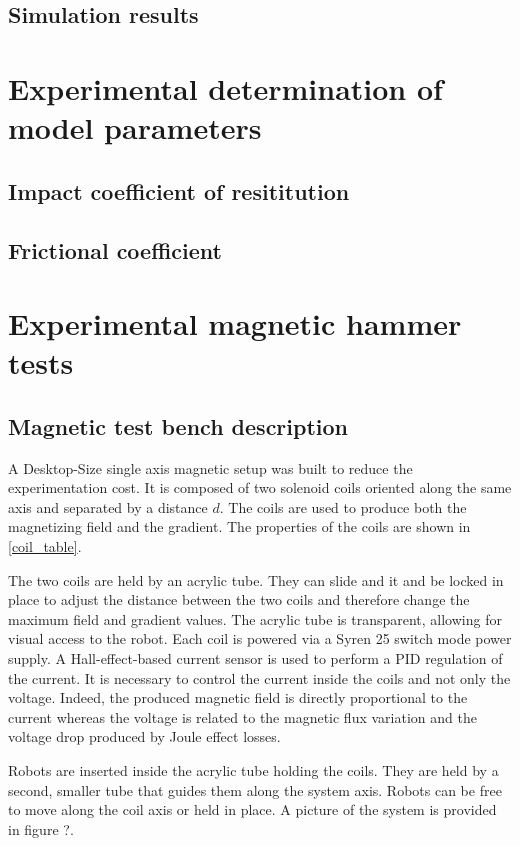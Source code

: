 \documentclass[letterpaper, 10 pt, conference]{ieeeconf}  %
\begin{document}
\subsection{Simulation results}


\section{Experimental determination of model parameters}

\subsection{Impact coefficient of resititution}

\subsection{Frictional coefficient}

\section{Experimental magnetic hammer tests}

\subsection{Magnetic test bench description}

A Desktop-Size single axis magnetic setup was built to reduce the experimentation cost. It is composed of two solenoid coils oriented along the same axis and separated by a distance $d$. The coils are used to produce both the magnetizing field and the gradient. The properties of the coils are shown in \cref{coil_table}.\par
The two coils are held by an acrylic tube. They can slide and it and be locked in place to adjust the distance between the two coils and therefore change the maximum field and gradient values. The acrylic tube is transparent, allowing for visual access to the robot.
Each coil is powered via a Syren 25 switch mode power supply. A Hall-effect-based current sensor is used to perform a PID regulation of the current. It is necessary to control the current inside the coils and not only the voltage. Indeed, the produced magnetic field is directly proportional to the current whereas the voltage is related to the magnetic flux variation and the voltage drop produced by Joule effect losses.\par
Robots are inserted inside the acrylic tube holding the coils. They are held by a second, smaller tube that guides them along the system axis. Robots can be free to move along the coil axis or held in place. A picture of the system is provided in figure ?.
\end{document}
